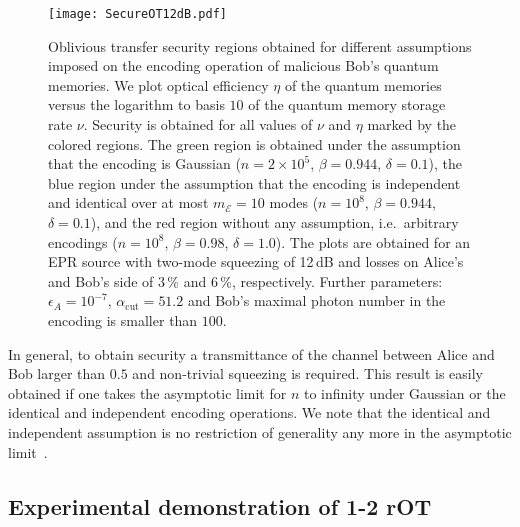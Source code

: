 \documentclass[aps,amsfonts,twoside,amssymb,superscriptaddress,twocolumn]{revtex4-1}
\newcommand*{\cE}{\mathcal{E}}
\begin{document}
\begin{figure}
    \begin{center}
        \texttt{[image: SecureOT12dB.pdf]}
        \caption{
Oblivious transfer security regions obtained for different assumptions imposed on the encoding operation of malicious Bob's quantum memories. We plot optical efficiency $\eta$ of the quantum memories versus the logarithm to basis $10$ of the quantum memory storage rate $\nu$. Security is obtained for all values of $\nu$ and $\eta$ marked by the colored regions. The green region is obtained under the assumption that the encoding is Gaussian ($n=2\times 10^5$, $\beta=0.944$, $\delta = 0.1$), the blue region under the assumption that the encoding is independent and identical over at most $m_{\cE}=10$ modes ($n = 10^8$, $\beta = 0.944$, $\delta = 0.1$), and the red region without any assumption, i.e.\ arbitrary encodings ($n=10^8$, $\beta=0.98$, $\delta = 1.0$). The plots are obtained for an EPR source with two-mode squeezing of 12\,dB and losses on Alice's and Bob's side of $3$\,\% and $6$\,\%, respectively. Further parameters: $\epsilon_A = 10^{-7}$, $\alpha_\text{cut} = 51.2$ and Bob's maximal photon number in the encoding is smaller than $100$.
}
        \label{fig:SecureOT}
    \end{center}
\end{figure}

In general, to obtain security a transmittance of the channel between Alice and Bob larger than $0.5$ and non-trivial squeezing is required. This result is easily obtained if one takes the asymptotic limit for $n$ to infinity under Gaussian or the identical and independent encoding operations. We note that the identical and independent assumption is no restriction of generality any more in the asymptotic limit~\cite{circac09}. 



\subsection{Experimental demonstration of 1-2 rOT} 
\end{document}
